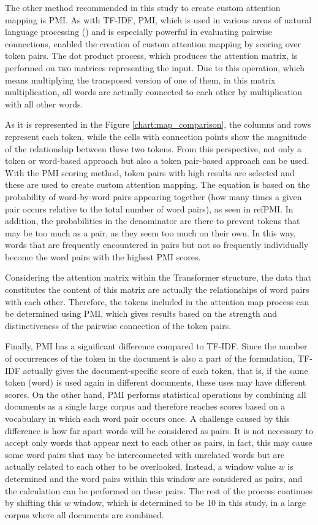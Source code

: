 \documentclass{iyte}
\begin{document}
The other method recommended in this study to create custom attention mapping is PMI. As with TF-IDF, PMI, which is used in various areas of natural language processing (\cite{pmi}) and is especially powerful in evaluating pairwise connections, enabled the creation of custom attention mapping by scoring over token pairs. The dot product process, which produces the attention matrix, is performed on two matrices representing the input. Due to this operation, which means multiplying the transposed version of one of them, in this matrix multiplication, all words are actually connected to each other by multiplication with all other words.

As it is represented in the Figure \ref{chart:map_comparison}, the columns and rows represent each token, while the cells with connection points show the magnitude of the relationship between these two tokens. From this perspective, not only a token or word-based approach but also a token pair-based approach can be used. With the PMI scoring method, token pairs with high results are selected and these are used to create custom attention mapping. The equation is based on the probability of word-by-word pairs appearing together (how many times a given pair occurs relative to the total number of word pairs), as seen in ref{PMI}. In addition, the probabilities in the denominator are there to prevent tokens that may be too much as a pair, as they seem too much on their own. In this way, words that are frequently encountered in pairs but not so frequently individually become the word pairs with the highest PMI scores.

Considering the attention matrix within the Transformer structure, the data that constitutes the content of this matrix are actually the relationships of word pairs with each other. Therefore, the tokens included in the attention map process can be determined using PMI, which gives results based on the strength and distinctiveness of the pairwise connection of the token pairs.

Finally, PMI has a significant difference compared to TF-IDF. Since the number of occurrences of the token in the document is also a part of the formulation, TF-IDF actually gives the document-specific score of each token, that is, if the same token (word) is used again in different documents, these uses may have different scores. On the other hand, PMI performs statistical operations by combining all documents as a single large corpus and therefore reaches scores based on a vocabulary in which each word pair occurs once. A challenge caused by this difference is how far apart words will be considered as pairs. It is not necessary to accept only words that appear next to each other as pairs, in fact, this may cause some word pairs that may be interconnected with unrelated words but are actually related to each other to be overlooked. Instead, a window value \(w\) is determined and the word pairs within this window are considered as pairs, and the calculation can be performed on these pairs. The rest of the process continues by shifting this \(w\) window, which is determined to be 10 in this study, in a large corpus where all documents are combined.
\end{document}
